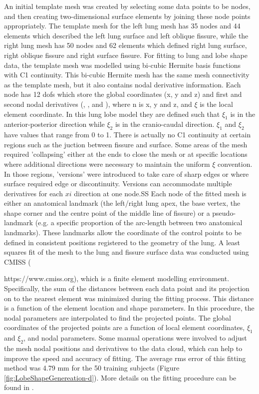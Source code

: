 An initial template mesh was created by selecting some data points to be nodes, and then creating two-dimensional surface elements by joining these node points appropriately. The template mesh for the left lung mesh has 35 nodes and 44 elements which described the left lung surface and left oblique fissure, while the right lung mesh has 50 nodes and 62 elements which defined right lung surface, right oblique fissure and right surface fissure. For fitting to lung and lobe shape data, the template mesh was modelled using bi-cubic Hermite basis functions with C1 continuity. This bi-cubic Hermite mesh has the same mesh connectivity as the template mesh, but it also contains nodal derivative information. Each node has 12 \gls{dof}s which store the global coordinates (x, y and z) and first and second nodal derivatives (, , and ), where n is x, y and z, and $\xi$ is the local element coordinate. In this lung lobe model they are defined such that $\xi_1$ is in the anterior-posterior direction while $\xi_2$ is in the cranio-caudal direction. $\xi_1$ and $\xi_2$ have values that range from 0 to 1. There is actually no C1 continuity at certain regions such as the juction between fissure and surface. Some areas of the mesh required 'collapsing' either at the ends to close the mesh or at specific locations where additional directions were necessary to maintain the uniform $\xi$ convention. In those regions, 'versions' were introduced to take care of sharp edges or where surface required edge or discontinuity. Versions can accommodate multiple derivatives for each $xi$ direction at one node.SS Each node of the fitted mesh is either an anatomical landmark (the left/right lung apex, the base vertex, the shape corner and the centre point of the middle line of fissure) or a pseudo-landmark (e.g. a specific proportion of the arc-length between two anatomical landmarks). These landmarks allow the coordinate of the control points to be defined in consistent positions registered to the geometry of the lung. A least squares fit of the mesh to the lung and fissure surface data was conducted using CMISS ({https://www.cmiss.org), which is a finite element modelling environment. Specifically, the sum of the distances between each data point and its projection on to the nearest element was minimized during the fitting process. This distance is a function of the element location and shape parameters. In this procedure, the nodal parameters are interpolated to find the projected points. The global coordinates of the projected points are a function of local element coordinates, $\xi_1$ and $\xi_2$, and nodal parameters. Some manual operations were involved to adjust the mesh nodal positions and derivatives to the data cloud, which can help to improve the speed and accuracy of fitting. The average \gls{rms} error of this fitting method was 4.79 mm for the 50 training subjects (Figure \ref{fig:LobeShapeGenereation-d}). More details on the fitting procedure can be found in  \citep{bradley1997geometric,tawhai2003developing, fernandez2004anatomically}.  


}
